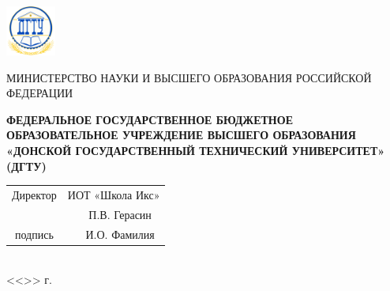 \begin{titlepage}
	\newcommand*{\entery}[3]{%
		{#1 \xleaders\hbox{\rule[-4pt]{1pt}{0.4pt}}\hfill\makebox[0pt]{#2}\xleaders\hbox{\rule[-4pt]{1pt}{0.4pt}}\hfill\mbox{}\\
		\vspace*{-1ex}\hphantom{#1} \hfill \scriptsize\strut #3\hfill\mbox{}}%
		}
	\newcommand*{\entxxx}[7]{%
		{#1 \xleaders\hbox{\rule[-4pt]{1pt}{0.4pt}}\hfill\makebox[0pt]{#2}\xleaders\hbox{\rule[-4pt]{1pt}{0.4pt}}\hfill\mbox{}\quad%
			\xleaders\hbox{\rule[-4pt]{1pt}{0.4pt}}\hfill\makebox[0pt]{#3}\xleaders\hbox{\rule[-4pt]{1pt}{0.4pt}}\hfill\mbox{}\quad%
			\xleaders\hbox{\rule[-4pt]{1pt}{0.4pt}}\hfill\makebox[0pt]{#4}\xleaders\hbox{\rule[-4pt]{1pt}{0.4pt}}\hfill\mbox{}\\
		\vspace*{-1ex}\hphantom{#1} \hfill \scriptsize\strut \makebox[0pt]{#5}\hfill\quad
									\hfill 						\makebox[0pt]{#6}\hfill\quad
									\hfill 						\makebox[0pt]{#7}\hfill\mbox{}%
			}%
		}
\centering\small
\includegraphics[width=16.4mm]{./graphics/img/DSTU-logo.png}

МИНИСТЕРСТВО НАУКИ И ВЫСШЕГО ОБРАЗОВАНИЯ РОССИЙСКОЙ ФЕДЕРАЦИИ

\textbf{
ФЕДЕРАЛЬНОЕ ГОСУДАРСТВЕННОЕ БЮДЖЕТНОЕ
ОБРАЗОВАТЕЛЬНОЕ УЧРЕЖДЕНИЕ ВЫСШЕГО ОБРАЗОВАНИЯ
«ДОНСКОЙ ГОСУДАРСТВЕННЫЙ ТЕХНИЧЕСКИЙ УНИВЕРСИТЕТ»\\
(ДГТУ)
}

\vfill

\raggedright \depNameFull

\vfill

\raggedleft
\renewcommand{\arraystretch}{0}
\begin{tabular}{ccccp{4em}}
	\strut Директор & \multicolumn{4}{c}{\strut ИОТ «Школа Икс»} \\
						\cline{2-5}
	\multicolumn{2}{c}{\hspace*{6em}} & \hfil & \multicolumn{2}{c}{\strut П.В. Герасин} \\
	\cline{1-2} 						\cline{4-5}
	\multicolumn{2}{c}{\scriptsize\strut  подпись} & & \multicolumn{2}{c}{\scriptsize\strut  И.О. Фамилия} \\
\end{tabular}\\
<<\underline{\makebox[10mm]{}}>> \underline{\makebox[35mm]{\turnmonth}} \turnyear г.


\end{titlepage}

